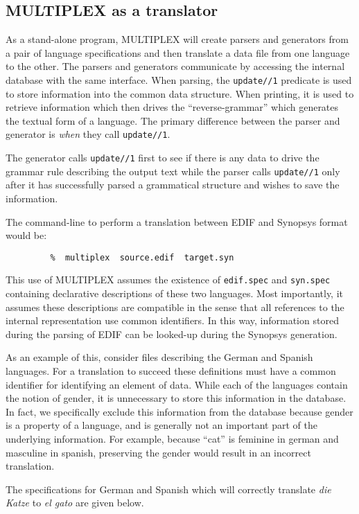 \subsection{MULTIPLEX as a translator}

As a stand-alone program, MULTIPLEX will create parsers
and generators from a pair of language specifications
and then translate a data file from one language to the 
other.  The parsers and generators communicate by accessing
the internal database with the same interface.
When parsing, the {\tt update//1} predicate is used to store
information into the common data structure. When printing, it
is used to retrieve information which then drives 
the ``reverse-grammar'' which generates the textual form
of a language. The primary difference between the parser and
generator is {\it when} they call {\tt update//1}.

The generator calls {\tt update//1} first to see if there is
any data to drive the grammar rule describing the output text
while the parser calls {\tt update//1} only after it has successfully
parsed a grammatical structure and wishes to save the information.

The command-line to perform a translation between EDIF
and Synopsys format would be:
\begin{verbatim}
         %  multiplex  source.edif  target.syn
\end{verbatim}
This use of MULTIPLEX assumes the existence of
{\tt edif.spec} and {\tt syn.spec} containing
declarative descriptions of these two languages.
Most importantly, it assumes these descriptions are compatible in
the sense that all references to the internal representation
use common identifiers. In this way, information stored during the
parsing of EDIF can be looked-up during the Synopsys generation.

As an example of this, consider files describing
the German and Spanish languages. For a translation to succeed
these definitions must have a common identifier for identifying
an element of data. While each of the languages contain
the notion of gender, it is unnecessary to store this information
in the database. In fact, we specifically exclude this
information from the database because gender is a
property of a language, and is generally not an important
part of the underlying information.  For example, because ``cat''
is feminine in german and masculine in spanish, preserving the
gender would result in an incorrect translation.

The specifications for German and Spanish which will
correctly translate {\it die Katze} to {\it el gato}
are given below.


